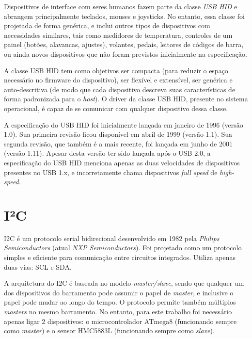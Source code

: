 \documentclass[brazil,pagestart=firstchapter]{abnt}
\begin{document}
Dispositivos de interface com seres humanos fazem parte da classe
\textit{USB \ac{HID}} e abrangem principalmente teclados, mouses e
joysticks. No entanto, essa classe foi projetada de forma genérica, e inclui
outros tipos de dispositivos com necessidades similares, tais como medidores
de temperatura, controles de um painel (botões, alavancas, ajustes),
volantes, pedais, leitores de códigos de barra, ou ainda novos dispositivos
que não foram previstos inicialmente na especificação. \cite[p.~1]{usbhid}

A classe \ac{USB} \ac{HID} tem como objetivos ser compacta (para reduzir o
espaço necessário no firmware do dispositivo), ser flexível e extensível,
ser genérica e auto-descritiva (de modo que cada dispositivo descreva suas
características de forma padronizada para o \textit{host}). O driver da
classe \ac{USB} \ac{HID}, presente no sistema operacional, é capaz de se
comunicar com qualquer dispositivo dessa classe. \cite[p.~2]{usbhid}

A especificação do \ac{USB} \ac{HID} foi inicialmente lançada em janeiro de
1996 (versão 1.0). Sua primeira revisão ficou disponível em abril de 1999
(versão 1.1). Sua segunda revisão, que também é a mais recente, foi lançada
em junho de 2001 (versão 1.11). Apesar desta versão ter sido lançada após o
\ac{USB} 2.0, a especificação do \ac{USB} \ac{HID} menciona apenas as duas
velocidades de dispositivos presentes no \ac{USB} 1.x, e incorretamente
chama dispositivos \textit{full speed} de \textit{high-speed}.
\cite{usbhid}


\section{I²C\label{sec:i2c}}

\ac{I2C} é um protocolo serial bidirecional desenvolvido em 1982 pela
\textit{Philips Semiconductors} (atual \textit{NXP Semiconductors}). Foi
projetado como um protocolo simples e eficiente para comunicação entre
circuitos integrados. Utiliza apenas duas vias: \ac{SCL} e \ac{SDA}.
\cite{UM10204}

A arquitetura do \ac{I2C} é baseada no modelo \textit{master/slave}, sendo
que qualquer um dos dispositivos do barramento pode assumir o papel de
\textit{master}, e inclusive o papel pode mudar ao longo do tempo. O
protocolo permite também múltiplos \textit{masters} no mesmo barramento.
\cite[p.~6]{UM10204} \cite[p.~161]{ATmega8} No entanto, para este trabalho
foi necessário apenas ligar 2 dispositivos: o microcontrolador ATmega8
(funcionando sempre como \textit{master}) e o sensor HMC5883L (funcionando
sempre como \textit{slave}).
\end{document}

